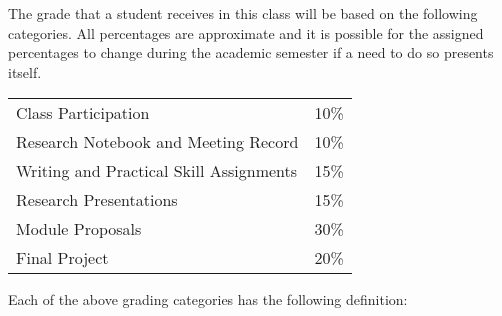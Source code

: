 The grade that a student receives in this class will be based on the
following categories. All percentages are approximate and it is possible
for the assigned percentages to change during the academic semester if a
need to do so presents itself. 

\begin{center}
\begin{tabular}{ll}
Class Participation&10\%\\
Research Notebook and Meeting Record&10\%\\
Writing and Practical Skill Assignments&15\%\\
Research Presentations&15\%\\
Module Proposals&30\%\\
Final Project&20\%
\end{tabular}
\end{center}

Each of the above grading categories has the following definition:

